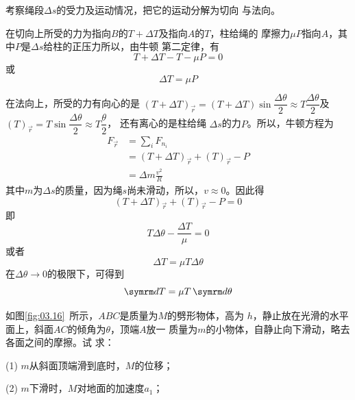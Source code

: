 \solution 考察绳段$ \Delta s $的受力及运动情况，把它的运动分解为切向
与法向。

在切向上所受的力为指向$ B $的$ T+\Delta T $及指向$ A $的$ T $，柱给绳的
摩擦力$ \mu P $指向$ A $，其中$ P $是$ \Delta s $给柱的正压力所以，由牛顿
第二定律，有
\begin{equation*}
    T + \Delta T - T - \mu P = 0
\end{equation*}
或\vspace{-1.56em}
\begin{equation*}
    \Delta T = \mu P
\end{equation*}

在法向上，所受的力有向心的是
$( T + \Delta T ) _ \vec{r} = ( T + \Delta T ) \sin \dfrac{ \Delta \theta }{ 2 } \approx T \dfrac { \Delta \theta }{2}$及$ (T)_{\vec{r}} = T \sin \dfrac { \Delta \theta } { 2 } \approx T \dfrac { \theta } { 2 }$，
还有离心的是柱给绳
$ \Delta s $的力$ P $。所以，牛顿方程为
\begin{align*}
    F _ { \vec{r} } &= \sum _ i  F _ { n _ { i } } \\
    &= ( T + \Delta T )_{\vec{r}} + ( T )_{\vec{r}} - P \\
    &= \Delta m \frac { v ^ { 2 } } { R }
\end{align*}
其中$ m $为$ \Delta s $的质量，因为绳$ s $尚未滑动，所以，$  v \approx 0 $。因此得
\begin{equation*}
    ( T + \Delta T ) _{\vec{ r }} + ( T ) _{\vec{ r }} - P = 0
\end{equation*}
即\vspace{-1.56em}
\begin{equation*}
    T \Delta \theta - \frac { \Delta T } { \mu } = 0
\end{equation*}
或者\vspace{-1.56em}
\begin{equation*}
    \Delta T = \mu T \Delta \theta
\end{equation*}
在$ \Delta \theta \rightarrow 0 $的极限下，可得到
\begin{equation*}
    \dif T = \mu T \dif \theta
\end{equation*}

\example 如图\ref{fig:03.16}~所示，$ ABC $是质量为$ M $的劈形物体，高为
$ h $，静止放在光滑的水平面上，斜面$ AC $的倾角为$\theta $，顶端$ A $放一
质量为$ m $的小物体，自静止向下滑动，略去各面之间的摩擦。试
求：

(1) $ m $从斜面顶端滑到底时，$ M $的位移；

(2) $ m $下滑时，$ M $对地面的加速度$ a_1 $；

